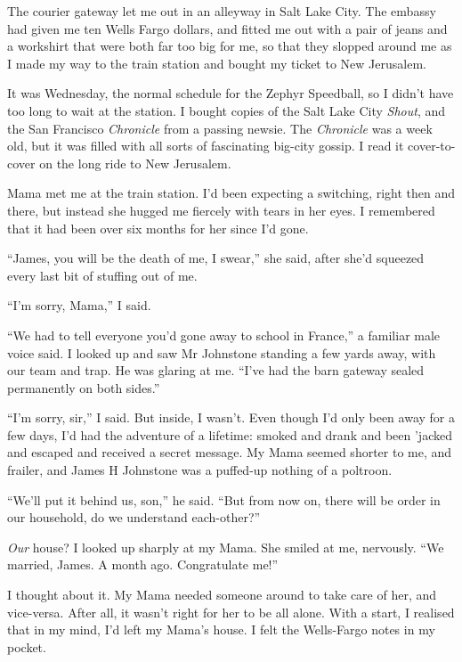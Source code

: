\tb

The courier gateway let me out in an alleyway in Salt Lake City.
The embassy had given me ten Wells Fargo dollars, and fitted me out
with a pair of jeans and a workshirt that were both far too big for
me, so that they slopped around me as I made my way to the train
station and bought my ticket to New Jerusalem.

It was Wednesday, the normal schedule for the Zephyr Speedball, so
I didn't have too long to wait at the station. I bought copies of
the Salt Lake City \emph{Shout}, and the San Francisco
\emph{Chronicle} from a passing newsie. The \emph{Chronicle} was a
week old, but it was filled with all sorts of fascinating big-city
gossip. I read it cover-to-cover on the long ride to New
Jerusalem.

Mama met me at the train station. I'd been expecting a switching,
right then and there, but instead she hugged me fiercely with tears
in her eyes. I remembered that it had been over six months for her
since I'd gone.

``James, you will be the death of me, I swear,'' she said, after
she'd squeezed every last bit of stuffing out of me.

``I'm sorry, Mama,'' I said.

``We had to tell everyone you'd gone away to school in France,'' a
familiar male voice said. I looked up and saw Mr Johnstone standing
a few yards away, with our team and trap. He was glaring at me.
``I've had the barn gateway sealed permanently on both sides.''

``I'm sorry, sir,'' I said. But inside, I wasn't. Even though I'd
only been away for a few days, I'd had the adventure of a lifetime:
smoked and drank and been 'jacked and escaped and received a secret
message. My Mama seemed shorter to me, and frailer, and James H
Johnstone was a puffed-up nothing of a poltroon.

``We'll put it behind us, son,'' he said.
``But from now on, there will be order in our household, do we understand 
each-other?''

\emph{Our} house? I looked up sharply at my Mama. She smiled at me,
nervously. ``We married, James. A month ago. Congratulate me!''

I thought about it. My Mama needed someone around to take care of
her, and vice-versa. After all, it wasn't right for her to be all
alone. With a start, I realised that in my mind, I'd left my Mama's
house. I felt the Wells-Fargo notes in my pocket.

